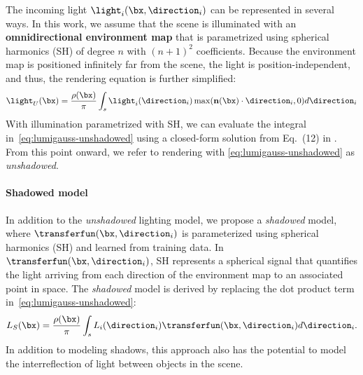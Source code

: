       The incoming light $\light_i(\bx, \direction_i)$ can be represented in several
      ways.
      In this work, we assume that the scene is illuminated with an
      \textbf{omnidirectional environment map} that is parametrized using spherical
      harmonics (SH) of degree $n$ with $(n{+}1)^2$ coefficients.
      Because the environment map is positioned infinitely far from the scene, the light is position-independent, and thus, the rendering equation is further simplified:
      \begin{equation}
        \label{eq:lumigauss-unshadowed}
        \light_{U}(\bx) = \frac{\rho(\bx)}{\pi} \int_{s} \light_i(\direction_i) \max(\mathbf{n}(\bx) \cdot \direction_i, 0) d\direction_i
      \end{equation}
      With illumination parametrized with SH, we can evaluate the integral
      in~\cref{eq:lumigauss-unshadowed} using a closed-form solution from Eq.~(12)
      in \cite{ramamoorthi2001envmap}.
      From this point onward, we refer to rendering with
      \cref{eq:lumigauss-unshadowed} as \textit{unshadowed}.

    \paragraph{Shadowed model}
      In addition to the \textit{unshadowed} lighting model, we propose a
      \textit{shadowed} model, where $\transferfun(\bx, \direction_i)$ is
      parameterized using spherical harmonics (SH) and learned from training data.
      In $\transferfun(\bx, \direction_i)$, SH represents a spherical signal that
      quantifies the light arriving from each direction of the environment map to an
      associated point in space.
      The \textit{shadowed} model is derived by replacing the dot product term in~\cref{eq:lumigauss-unshadowed}:
      \begin{equation}
        \label{eq:lumigauss-shadowed}
        L_{S}(\bx) = \frac{\rho(\bx)}{\pi} \int_{s} L_i(\direction_i)
        \transferfun(\bx, \direction_i) d\direction_i.
      \end{equation}
      In addition to modeling shadows, this approach also has the potential to model
      the interreflection of light between objects in the scene.


